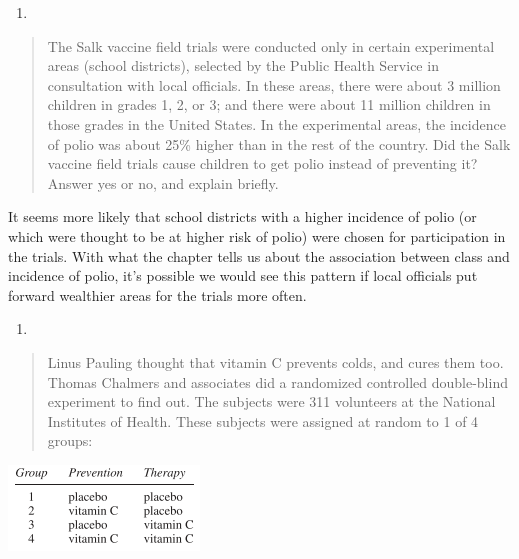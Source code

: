 \documentclass[
]{book}
\providecommand{\tightlist}{%
  \setlength{\itemsep}{0pt}\setlength{\parskip}{0pt}}
\begin{document}
\begin{enumerate}
\def\labelenumi{\arabic{enumi}.}
\setcounter{enumi}{3}
\tightlist
\item
\end{enumerate}

\begin{quote}
The Salk vaccine field trials were conducted only in certain experimental areas (school districts), selected by the Public Health Service in consultation with local officials. In these areas, there were about 3 million children in grades 1, 2, or 3; and there were about 11 million children in those grades in the United States. In the experimental areas, the incidence of polio was about 25\% higher than in the rest of the country. Did the Salk vaccine field trials cause children to get polio instead of preventing it? Answer yes or no, and explain briefly.
\end{quote}

It seems more likely that school districts with a higher incidence of polio (or which were thought to be at higher risk of polio) were chosen for participation in the trials. With what the chapter tells us about the association between class and incidence of polio, it's possible we would see this pattern if local officials put forward wealthier areas for the trials more often.

\begin{enumerate}
\def\labelenumi{\arabic{enumi}.}
\setcounter{enumi}{4}
\tightlist
\item
\end{enumerate}

\begin{quote}
Linus Pauling thought that vitamin C prevents colds, and cures them too. Thomas Chalmers and associates did a randomized controlled double-blind experiment to find out. The subjects were 311 volunteers at the National Institutes of Health.
These subjects were assigned at random to 1 of 4 groups:
\end{quote}

\includegraphics{images/Ch02Img01.png}
\end{document}

